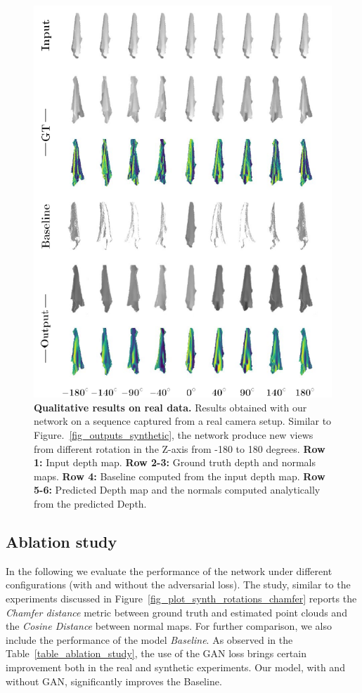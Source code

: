 \begin{figure}[!h]
\begin{center}
    \includegraphics[width=0.5\linewidth]{main/chapter04/data/ipalm_cvpr_grid_real_vertical.pdf}
    \caption[Qualitative results on real data]{{\bf Qualitative results on real data.} Results obtained with our network on a sequence captured from a real camera setup. Similar to Figure.~\ref{fig_outputs_synthetic}, the network produce new views from different rotation in the Z-axis from -180 to 180 degrees. \textbf{Row 1:} Input depth map. \textbf{Row 2-3:} Ground truth depth and normals maps. \textbf{Row 4:} Baseline computed from the input depth map. \textbf{Row 5-6:} Predicted Depth map and the normals computed analytically from the predicted Depth.}
    \label{fig_outputs_real}
\end{center}
\end{figure}

\subsection{Ablation study}

In the following we evaluate the performance of the network under different configurations (with and without the adversarial loss). The study, similar to the experiments discussed in Figure~\ref{fig_plot_synth_rotations_chamfer} reports the \textit{Chamfer distance} metric  between ground truth and estimated point clouds  and the \textit{Cosine Distance} between normal maps.  For further comparison, we also include the performance of the model {\em Baseline}. As observed in the Table~\ref{table_ablation_study}, the use of the GAN loss brings certain improvement both in the real and synthetic experiments. Our model, with and without GAN, significantly improves the Baseline.

